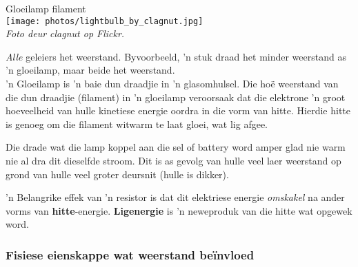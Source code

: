 \begin{minipage}{.5\textwidth}
\begin{center}
Gloeilamp filament\\
\texttt{[image: photos/lightbulb\_by\_clagnut.jpg]}\\
\textit{Foto deur clagnut op Flickr.}
\end{center}  
\end{minipage}
\begin{minipage}{.5\textwidth}

\textit{Alle} geleiers het weerstand. Byvoorbeeld, 'n stuk draad het
minder weerstand as 'n gloeilamp, maar beide het weerstand. \\

 'n Gloeilamp is 'n baie dun draadjie in 'n glasomhulsel. Die ho\"e weerstand van
die dun draadjie (filament) in 'n gloeilamp veroorsaak dat die elektrone 'n
groot hoeveelheid van hulle kinetiese energie oordra in die vorm van hitte.
Hierdie hitte is genoeg om die filament witwarm te laat gloei, wat lig afgee.

\end{minipage}

Die drade wat die lamp koppel aan die sel of battery word amper glad nie warm
nie al dra dit dieselfde stroom. Dit is as gevolg van hulle veel laer
weerstand op grond van hulle veel groter deursnit (hulle is dikker).

 'n Belangrike effek van 'n resistor is dat dit elektriese energie
\textit{omskakel} na ander vorms van \textbf{hitte}-energie.
\textbf{Ligenergie} is 'n neweproduk van die hitte wat opgewek word.


\subsubsection{Fisiese eienskappe wat weerstand be\"invloed}

